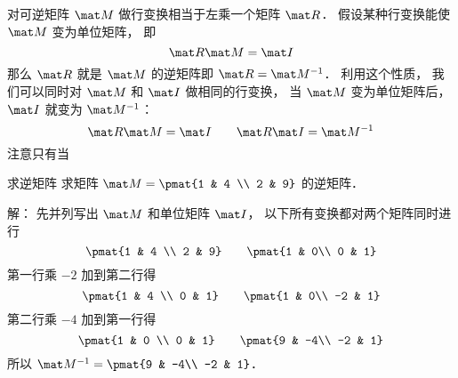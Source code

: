 
\begin{issues}
\issueDraft
\end{issues}


对可逆矩阵 $\mat M$ 做行变换相当于左乘一个矩阵 $\mat R$． 假设某种行变换能使 $\mat M$ 变为单位矩阵， 即
\begin{equation}
\mat R \mat M = \mat I
\end{equation}
那么 $\mat R$ 就是 $\mat M$ 的逆矩阵即 $\mat R = \mat M^{-1}$． 利用这个性质， 我们可以同时对 $\mat M$ 和 $\mat I$ 做相同的行变换， 当 $\mat M$ 变为单位矩阵后， $\mat I$ 就变为 $\mat M^{-1}$：
\begin{equation}
\mat R\mat M = \mat I
\qquad
\mat R \mat I = \mat M^{-1}
\end{equation}
注意只有当

\begin{example}{求逆矩阵}
求矩阵 $\mat M = \pmat{1 & 4 \\ 2 & 9}$ 的逆矩阵．

解： 先并列写出 $\mat M$ 和单位矩阵 $\mat I$， 以下所有变换都对两个矩阵同时进行
\begin{equation}
\pmat{1 & 4 \\ 2 & 9} \qquad \pmat{1 & 0\\ 0 & 1}
\end{equation}
第一行乘 $-2$ 加到第二行得
\begin{equation}
\pmat{1 & 4 \\ 0 & 1} \qquad \pmat{1 & 0\\ -2 & 1}
\end{equation}
第二行乘 $-4$ 加到第一行得
\begin{equation}
\pmat{1 & 0 \\ 0 & 1} \qquad \pmat{9 & -4\\ -2 & 1}
\end{equation}
所以 $\mat M^{-1} = \pmat{9 & -4\\ -2 & 1}$．
\end{example}
